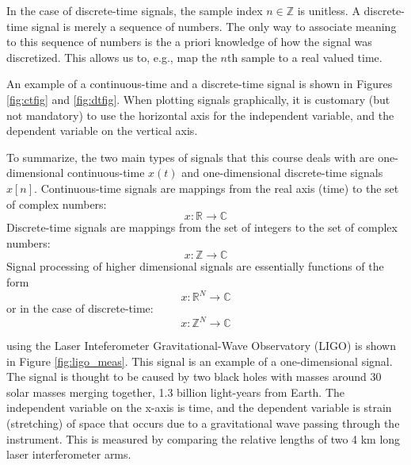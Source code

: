 In the case of discrete-time signals, the sample index
$n \in \mathbb{Z}$ is unitless. A discrete-time signal is merely a sequence of numbers. The only way to associate meaning to this sequence of numbers is the a priori knowledge of how the signal was discretized. This allows us to, e.g., map the $n$th sample to a real valued time.

An example of a continuous-time and a discrete-time signal is shown in Figures \ref{fig:ctfig} and \ref{fig:dtfig}. When plotting signals graphically, it is customary (but not mandatory) to use the horizontal axis for the independent variable, and the dependent variable on the vertical axis.

To summarize, the two main types of signals that this course deals with are one-dimensional continuous-time $x(t)$ and one-dimensional discrete-time signals $x[n]$. Continuous-time signals are mappings from the real axis (time) to the set of complex numbers:
\begin{equation}
\boxed{
x: \mathbb{R} \rightarrow \mathbb{C}
}
\end{equation}
Discrete-time signals are mappings from the set of integers to the set of complex numbers:
\begin{equation}
\boxed{
x: \mathbb{Z} \rightarrow \mathbb{C}
}
\end{equation}
Signal processing of higher dimensional signals are essentially functions of the form
\begin{equation}
x: \mathbb{R}^N \rightarrow \mathbb{C}
\end{equation}
or in the case of discrete-time:
\begin{equation}
x: \mathbb{Z}^N \rightarrow \mathbb{C}
\end{equation}

 using the Laser Inteferometer Gravitational-Wave Observatory (LIGO) is shown in Figure \ref{fig:ligo_meas}. This signal is an example of a one-dimensional signal. The signal is thought to be caused by two black holes with masses around 30 solar masses merging together, 1.3 billion light-years from Earth. The independent variable on the x-axis is time, and the dependent variable is strain (stretching) of space that occurs due to a gravitational wave passing through the instrument. This is measured by comparing the relative lengths of two 4 km long laser interferometer arms. 

